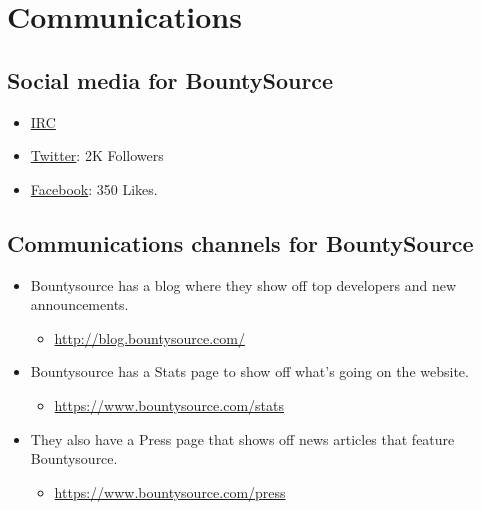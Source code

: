 \section{Communications}\label{communications}

\subsection{Social media for
BountySource}\label{social-media-for-bountysource}

\begin{itemize}
\itemsep1pt\parskip0pt
\item
  \href{FreeNode,\%20\#bountysource}{IRC}
\item
  \href{https://twitter.com/Bountysource}{Twitter}: 2K Followers
\item
  \href{https://www.facebook.com/BountySource}{Facebook}: 350 Likes.
\end{itemize}

\subsection{Communications channels for
BountySource}\label{communications-channels-for-bountysource}

\begin{itemize}
\itemsep1pt\parskip0pt
\item
  Bountysource has a blog where they show off top developers and new
  announcements.

  \begin{itemize}
  \itemsep1pt\parskip0pt
  \item
    \url{http://blog.bountysource.com/}
  \end{itemize}
\item
  Bountysource has a Stats page to show off what's going on the website.

  \begin{itemize}
  \itemsep1pt\parskip0pt
  \item
    \url{https://www.bountysource.com/stats}
  \end{itemize}
\item
  They also have a Press page that shows off news articles that feature
  Bountysource.

  \begin{itemize}
  \itemsep1pt\parskip0pt
  \item
    \url{https://www.bountysource.com/press}
  \end{itemize}
\end{itemize}

